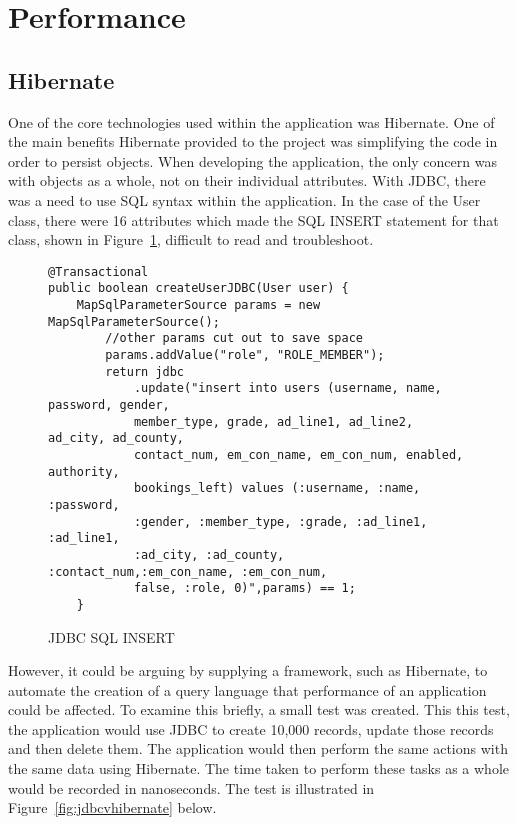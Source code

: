\section{Performance}

\subsection{Hibernate}

One of the core technologies used within the application was Hibernate. One of the main benefits Hibernate provided to the project was simplifying the code in order to persist objects. When developing the application, the only concern was with objects as a whole, not on their individual attributes. With JDBC, there was a need to use SQL syntax within the application. In the case of the User class, there were 16 attributes which made the SQL INSERT statement for that class, shown in Figure~\ref{fig:jdbcsql}, difficult to read and troubleshoot.

\begin{figure}[H]
\begin{lstlisting}
@Transactional
public boolean createUserJDBC(User user) {
	MapSqlParameterSource params = new MapSqlParameterSource();
		//other params cut out to save space
		params.addValue("role", "ROLE_MEMBER");
		return jdbc
			.update("insert into users (username, name, password, gender, 
			member_type, grade, ad_line1, ad_line2, ad_city, ad_county,
			contact_num, em_con_name, em_con_num, enabled, authority,
			bookings_left) values (:username, :name, :password, 
			:gender, :member_type, :grade, :ad_line1, :ad_line1, 
			:ad_city, :ad_county, :contact_num,:em_con_name, :em_con_num,
			false, :role, 0)",params) == 1;
	}
\end{lstlisting}
\caption{JDBC SQL INSERT}
\label{fig:jdbcsql}
\end{figure}

However, it could be arguing by supplying a framework, such as Hibernate, to automate the creation of a query language that performance of an application could be affected. To examine this briefly, a small test was created. This this test, the application would use JDBC to create 10,000 records, update those records and then delete them. The application would then perform the same actions with the same data using Hibernate. The time taken to perform these tasks as a whole would be recorded in nanoseconds. The test is illustrated in Figure~\ref{fig:jdbcvhibernate} below.

